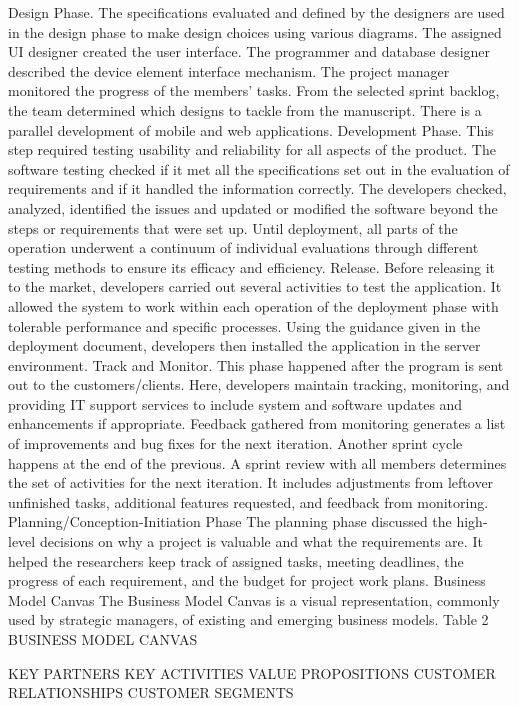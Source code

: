 Design Phase. The specifications evaluated and defined by the designers are used in the design phase to make design choices using various diagrams. The assigned UI designer created the user interface. The programmer and database designer described the device element interface mechanism. The project manager monitored the progress of the members' tasks. From the selected sprint backlog, the team determined which designs to tackle from the manuscript. There is a parallel development of mobile and web applications.
Development Phase. This step required testing usability and reliability for all aspects of the product. The software testing checked if it met all the specifications set out in the evaluation of requirements and if it handled the information correctly.
The developers checked, analyzed, identified the issues and updated or modified the software beyond the steps or requirements that were set up. Until deployment, all parts of the operation underwent a continuum of individual evaluations through different testing methods to ensure its efficacy and efficiency.
Release. Before releasing it to the market, developers carried out several activities to test the application. It allowed the system to work within each operation of the deployment phase with tolerable performance and specific processes. Using the guidance given in the deployment document, developers then installed the application in the server environment. 
Track and Monitor. This phase happened after the program is sent out to the customers/clients. Here, developers maintain tracking, monitoring, and providing IT support services to include system and software updates and enhancements if appropriate. Feedback gathered from monitoring generates a list of improvements and bug fixes for the next iteration.
Another sprint cycle happens at the end of the previous. A sprint review with all members determines the set of activities for the next iteration. It includes adjustments from leftover unfinished tasks, additional features requested, and feedback from monitoring.
Planning/Conception-Initiation Phase
The planning phase discussed the high-level decisions on why a project is valuable and what the requirements are. It helped the researchers keep track of assigned tasks, meeting deadlines, the progress of each requirement, and the budget for project work plans.
Business Model Canvas
The Business Model Canvas is a visual representation, commonly used by strategic managers, of existing and emerging business models.
Table 2
BUSINESS MODEL CANVAS

KEY PARTNERS
	KEY ACTIVITIES
	VALUE PROPOSITIONS
	CUSTOMER RELATIONSHIPS
	CUSTOMER SEGMENTS

